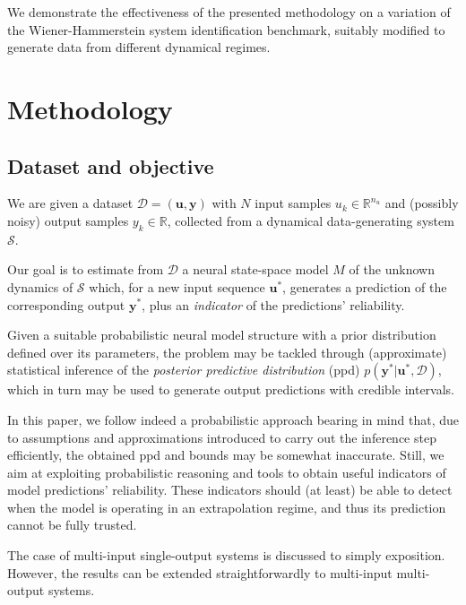 \documentclass{ifacconf}
\newcommand{\nin}{{n_u}}
\newcommand{\nsamp}{N}
\newcommand{\tvec}[1]{{\mathbf{#1}}}
\newcommand{\D}{\mathcal{D}} %
\begin{document}
We demonstrate the effectiveness of the presented methodology on a variation of the Wiener-Hammerstein \citep{schoukens2009wiener} system identification benchmark, suitably modified to generate data from different dynamical regimes. 



\section{Methodology}
\subsection{Dataset and objective}
We are given a dataset $\D=(\tvec{u}, \tvec{y})$ with $\nsamp$ input samples $u_k \in \mathbb{R}^{\nin}$ and (possibly noisy) output samples $y_k \in \mathbb{R}$, collected from a dynamical data-generating system $\mathcal{S}$. 

Our goal is to estimate from $\D$ a neural state-space model $M$ of the unknown dynamics of $\mathcal{S}$ which, for a new input sequence $\tvec{u}^*$, generates a prediction of the corresponding output ${\tvec{y}}^*$, plus an \emph{indicator} of the predictions' reliability. 

Given a suitable probabilistic neural model structure with a prior distribution defined over its parameters, the problem may be tackled through (approximate) statistical inference of the \emph{posterior predictive distribution}  (ppd) $p(\tvec{y}^* | \tvec{u}^*, \D)$, which in turn may be used to generate output predictions with credible intervals. 

In this paper, we follow indeed a probabilistic approach bearing in mind that, due to assumptions and approximations introduced to carry out the inference step efficiently, the obtained ppd and bounds may be somewhat inaccurate. Still, we aim at exploiting probabilistic reasoning and tools to obtain  useful
indicators of model predictions' reliability. These indicators should (at least) be able to detect when the model is operating in an extrapolation
regime, and thus its prediction cannot be fully trusted.

The case of multi-input single-output systems is discussed to simply exposition. However, the results can be extended straightforwardly to multi-input multi-output systems. 
\end{document}
